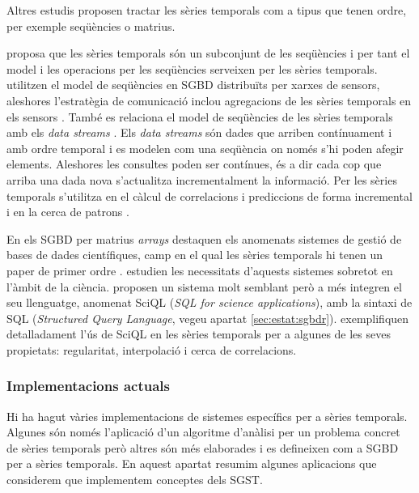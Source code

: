 Altres estudis proposen tractar les sèries temporals com a tipus que tenen ordre, per exemple seqüències o matrius.

\textcite{seshadri96:thesis} proposa que les sèries temporals són un subconjunt de les seqüències i per tant el model i les operacions per les seqüències \parencite{seshadri95} serveixen per les sèries temporals. 
\textcite{bonnet01} utilitzen el model de seqüències en SGBD distribuïts per xarxes de sensors, aleshores l'estratègia de comunicació inclou agregacions de les sèries temporals en els sensors \parencite{demers03}.
També es relaciona el model de seqüències de les sèries temporals amb els \emph{data streams} \parencite{babcock02,jagadish95,ogras06}. Els \emph{data streams} són dades que arriben contínuament i amb ordre temporal i es modelen com una seqüència on només s'hi poden afegir elements. Aleshores les consultes poden ser contínues, és a dir cada cop que arriba una dada nova s'actualitza incrementalment la informació. Per les sèries temporals s'utilitza en el càlcul de correlacions i prediccions de forma incremental \parencite{yi00} i en la cerca de patrons \parencite{bai05}.

En els SGBD per matrius \emph{arrays} destaquen els anomenats sistemes
de gestió de bases de dades científiques, camp en el qual les sèries
temporals hi tenen un paper de primer
ordre \parencite{zhang11}. \textcite{stonebraker09:scidb} estudien les
necessitats d'aquests sistemes sobretot en l'àmbit de la
ciència. \textcite{kersten11} proposen un sistema molt semblant però a
més integren el seu llenguatge, anomenat SciQL (\emph{SQL for
  science applications}), amb la sintaxi de SQL (\emph{Structured Query Language},
vegeu apartat \ref{sec:estat:sgbdr}). \textcite{zhang11} exemplifiquen
detalladament l'ús de SciQL en les sèries temporals per a algunes de
les seves propietats: regularitat, interpolació i cerca de
correlacions.



\subsubsection{Implementacions actuals}

Hi ha hagut vàries implementacions de sistemes específics per a sèries
temporals. Algunes són només l'aplicació d'un algoritme d'anàlisi per
un problema concret de sèries temporals però altres són més elaborades
i es defineixen com a SGBD per a sèries temporals.  En aquest apartat
resumim algunes aplicacions que considerem que implementem conceptes
dels SGST.




